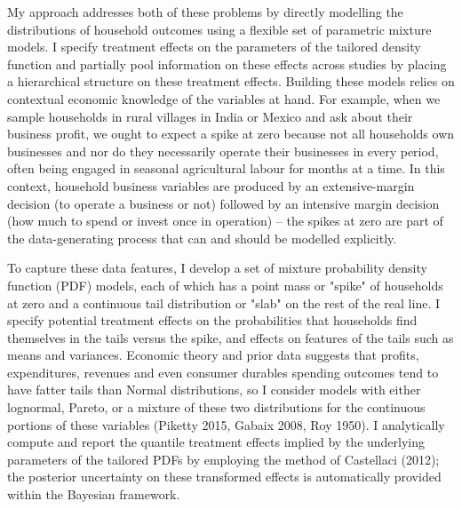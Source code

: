 \documentclass[english,12pt]{article}\usepackage{lmodern}
\numberwithin{equation}{section}
\begin{document}
My approach addresses both of these problems by directly modelling the distributions of household outcomes using a flexible set of parametric mixture models. I specify treatment effects on the parameters of the tailored density function and partially pool information on these effects across studies by placing a hierarchical structure on these treatment effects. Building these models relies on contextual economic knowledge of the variables at hand. For example, when we sample households in rural villages in India or Mexico and ask about their business profit, we ought to expect a spike at zero because not all households own businesses and nor do they necessarily operate their businesses in every period, often being engaged in seasonal agricultural labour for months at a time. In this context, household business variables are produced by an extensive-margin decision (to operate a business or not) followed by an intensive margin decision (how much to spend or invest once in operation) -- the spikes at zero are part of the data-generating process that can and should be modelled explicitly. 

To capture these data features, I develop a set of mixture probability density function (PDF) models, each of which has a point mass or "spike" of households at zero and a continuous tail distribution or "slab" on the rest of the real line.  I specify potential treatment effects on the probabilities that households find themselves in the tails versus the spike, and effects on features of the tails such as means and variances. Economic theory and prior data suggests that profits, expenditures, revenues and even consumer durables spending outcomes tend to have fatter tails than Normal distributions, so I consider models with either lognormal, Pareto, or a mixture of these two distributions for the continuous portions of these variables (Piketty 2015, Gabaix 2008, Roy 1950). I analytically compute and report the quantile treatment effects implied by the underlying parameters of the tailored PDFs by employing the method of Castellaci (2012); the posterior uncertainty on these transformed effects is automatically provided within the Bayesian framework. 
\end{document}
